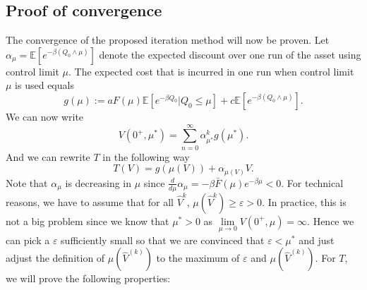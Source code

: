 \subsection{Proof of convergence}
The convergence of the proposed iteration method will now be proven.
Let $\alpha_\mu=\mathbb{E}[e^{-\beta (Q_0\wedge\mu)}]$ denote the expected discount over one run of the asset using control limit $\mu$.
The expected cost that is incurred in one  run when control limit $\mu$ is used equals
$$
g(\mu):=aF(\mu)\mathbb{E}[e^{-\beta Q_0}|Q_0\leq \mu]+c\mathbb{E}[e^{-\beta(Q_0\wedge\mu)}].
$$
We can now write
$$
V(0^+,\mu^*)=\sum\limits_{n=0}^\infty \alpha_{\mu^*}^kg(\mu^*).
$$
And we can rewrite $T$ in the following way
\[
T(V)=g(\mu(V))+\alpha_{\mu(V)}V.
\]
Note that $\alpha_\mu$ is decreasing in $\mu$ since $\frac{d}{d\mu}\alpha_\mu=-\beta\bar F(\mu)e^{-\beta \mu}<0$.
For technical reasons, we have to assume that for all $\hat{V}^{k}$, $\mu(\hat{V}^{k})\geq\varepsilon>0$.
In practice, this is not a big problem since we know that $\mu^*>0$ as $\lim\limits_{\mu\rightarrow 0}V(0^+,\mu)=\infty$.
Hence we can pick a $\varepsilon$ sufficiently small so that we are convinced that $\varepsilon<\mu^*$ and just adjust the definition of $\mu(\hat{V}^{(k)})$ to the maximum of $\varepsilon$ and $\mu(\hat{V}^{(k)})$.
For $T$, we will prove the following properties:
